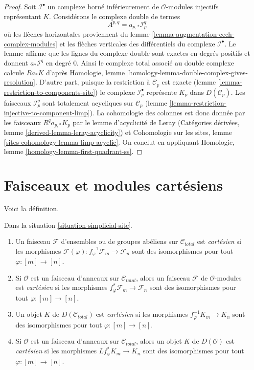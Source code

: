\begin{proof}
Soit $\mathcal{I}^\bullet$ un complexe borné inférieurement de
$\mathcal{O}$-modules injectifs représentant $K$. Considérons le complexe double de termes
$$
A^{p, q} = a_{p, *}\mathcal{I}^q_p
$$
où les flèches horizontales proviennent du
lemme \ref{lemma-augmentation-cech-complex-modules}
et les flèches verticales des différentiels du complexe
$\mathcal{I}^\bullet$. Le lemme
affirme que les lignes du complexe double sont exactes
en degrés positifs et donnent
$a_*\mathcal{I}^q$ en degré $0$.
Ainsi le complexe total associé au double complexe
calcule $Ra_*K$ d'après
Homologie, lemme \ref{homology-lemma-double-complex-gives-resolution}.
D'autre part, puisque la restriction à $\mathcal{C}_p$ est exacte
(lemme \ref{lemma-restriction-to-components-site})
le complexe $\mathcal{I}_p^\bullet$ représente $K_p$ dans
$D(\mathcal{C}_p)$. Les faisceaux $\mathcal{I}_p^q$
sont totalement acycliques sur $\mathcal{C}_p$
(lemme \ref{lemma-restriction-injective-to-component-limp}).
La cohomologie des colonnes est donc donnée par les faisceaux
$R^qa_{p, *}K_p$ par le lemme d'acyclicité de Leray
(Catégories dérivées, lemme \ref{derived-lemma-leray-acyclicity})
et
Cohomologie sur les sites, lemme \ref{sites-cohomology-lemma-limp-acyclic}.
On conclut en appliquant
Homologie, lemme \ref{homology-lemma-first-quadrant-ss}.
\end{proof}





\section{Faisceaux et modules cartésiens}
\label{section-cartesian}

\noindent
Voici la définition.

\begin{definition}
\label{definition-cartesian-sheaf}
Dans la situation \ref{situation-simplicial-site}.
\begin{enumerate}
\item Un faisceau $\mathcal{F}$ d'ensembles ou de groupes abéliens sur
$\mathcal{C}_{total}$ est {\it cartésien} si les morphismes
$\mathcal{F}(\varphi) : f_\varphi^{-1}\mathcal{F}_m \to \mathcal{F}_n$
sont des isomorphismes pour tout $\varphi : [m] \to [n]$.
\item Si $\mathcal{O}$ est un faisceau d'anneaux sur $\mathcal{C}_{total}$,
alors un faisceau $\mathcal{F}$ de $\mathcal{O}$-modules est
{\it cartésien} si les morphismes $f_\varphi^*\mathcal{F}_m \to \mathcal{F}_n$
sont des isomorphismes pour tout $\varphi : [m] \to [n]$.
\item Un objet $K$ de $D(\mathcal{C}_{total})$ est {\it cartésien} si les morphismes
$f_\varphi^{-1}K_m \to K_n$
sont des isomorphismes pour tout $\varphi : [m] \to [n]$.
\item Si $\mathcal{O}$ est un faisceau d'anneaux sur $\mathcal{C}_{total}$, alors
un objet $K$ de $D(\mathcal{O})$ est {\it cartésien} si les morphismes
$Lf_\varphi^*K_m \to K_n$
sont des isomorphismes pour tout $\varphi : [m] \to [n]$.
\end{enumerate}
\end{definition}

